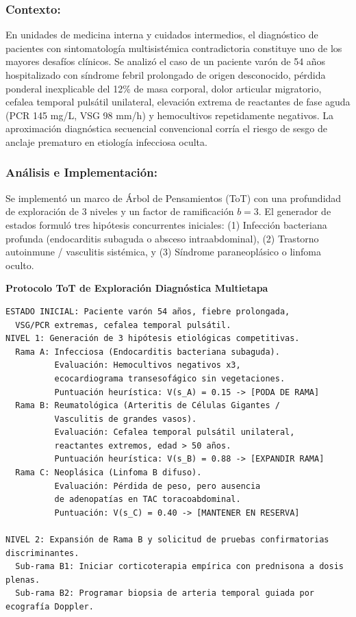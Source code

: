 \subsubsection*{Contexto:}
En unidades de medicina interna y cuidados intermedios, el diagnóstico de pacientes con sintomatología multisistémica contradictoria constituye uno de los mayores desafíos clínicos. Se analizó el caso de un paciente varón de 54 años hospitalizado con síndrome febril prolongado de origen desconocido, pérdida ponderal inexplicable del 12\% de masa corporal, dolor articular migratorio, cefalea temporal pulsátil unilateral, elevación extrema de reactantes de fase aguda (PCR 145 mg/L, VSG 98 mm/h) y hemocultivos repetidamente negativos. La aproximación diagnóstica secuencial convencional corría el riesgo de sesgo de anclaje prematuro en etiología infecciosa oculta.

\subsubsection*{Análisis e Implementación:}
Se implementó un marco de Árbol de Pensamientos (ToT) con una profundidad de exploración de 3 niveles y un factor de ramificación $b = 3$. El generador de estados formuló tres hipótesis concurrentes iniciales: (1) Infección bacteriana profunda (endocarditis subaguda o absceso intraabdominal), (2) Trastorno autoinmune / vasculitis sistémica, y (3) Síndrome paraneoplásico o linfoma oculto.

\begin{tcolorbox}[colback=bg_marfil, colframe=unmsm_gold, arc=3pt, boxrule=0.6pt, top=0.3cm, bottom=0.3cm, left=0.4cm, right=0.4cm]
\footnotesize\sffamily
\textbf{Protocolo ToT de Exploración Diagnóstica Multietapa}\\[0.15cm]
\begin{verbatim}
ESTADO INICIAL: Paciente varón 54 años, fiebre prolongada,
  VSG/PCR extremas, cefalea temporal pulsátil.
NIVEL 1: Generación de 3 hipótesis etiológicas competitivas.
  Rama A: Infecciosa (Endocarditis bacteriana subaguda).
          Evaluación: Hemocultivos negativos x3,
          ecocardiograma transesofágico sin vegetaciones.
          Puntuación heurística: V(s_A) = 0.15 -> [PODA DE RAMA]
  Rama B: Reumatológica (Arteritis de Células Gigantes /
          Vasculitis de grandes vasos).
          Evaluación: Cefalea temporal pulsátil unilateral,
          reactantes extremos, edad > 50 años.
          Puntuación heurística: V(s_B) = 0.88 -> [EXPANDIR RAMA]
  Rama C: Neoplásica (Linfoma B difuso).
          Evaluación: Pérdida de peso, pero ausencia
          de adenopatías en TAC toracoabdominal.
          Puntuación: V(s_C) = 0.40 -> [MANTENER EN RESERVA]

NIVEL 2: Expansión de Rama B y solicitud de pruebas confirmatorias discriminantes.
  Sub-rama B1: Iniciar corticoterapia empírica con prednisona a dosis plenas.
  Sub-rama B2: Programar biopsia de arteria temporal guiada por ecografía Doppler.
\end{verbatim}
\end{tcolorbox}

